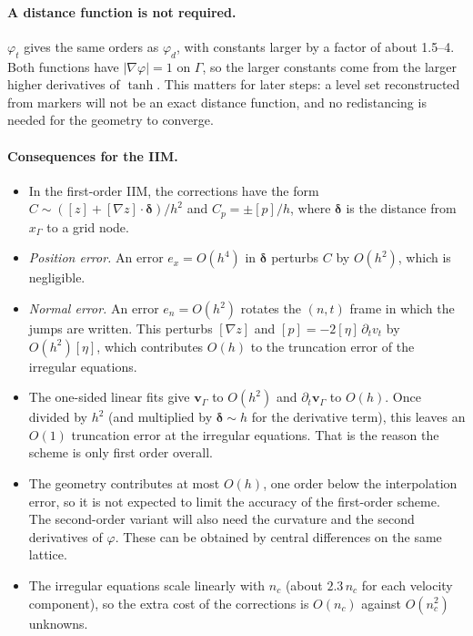 \documentclass[11pt,a4paper]{article}
\begin{document}
\paragraph{A distance function is not required.}
$\varphi_t$ gives the same orders as $\varphi_d$, with constants larger by a factor of about
1.5--4. Both functions have $|\nabla\varphi|=1$ on $\Gamma$, so the larger constants come from
the larger higher derivatives of $\tanh$. This matters for later steps: a level set reconstructed from
markers will not be an exact distance function, and no redistancing is needed for the geometry
to converge.

\paragraph{Consequences for the IIM.}
\begin{itemize}
  \item In the first-order IIM, the corrections have the form
    $C\sim([z]+[\nabla z]\cdot\boldsymbol\delta)/h^2$ and $C_p=\pm[p]/h$, where
    $\boldsymbol\delta$ is the distance from $x_\Gamma$ to a grid node.
  \item \emph{Position error.} An error $e_x=O(h^4)$ in $\boldsymbol\delta$ perturbs $C$ by
    $O(h^2)$, which is negligible.
  \item \emph{Normal error.} An error $e_n=O(h^2)$ rotates the $(n,t)$ frame in which the jumps
    are written. This perturbs $[\nabla z]$ and $[p]=-2[\eta]\,\partial_t v_t$ by
    $O(h^2)[\eta]$, which contributes $O(h)$ to the truncation error of the irregular
    equations.
  \item The one-sided linear fits give $\mathbf v_\Gamma$ to $O(h^2)$ and
    $\partial_t\mathbf v_\Gamma$ to $O(h)$. Once divided by $h^2$ (and multiplied by
    $\boldsymbol\delta\sim h$ for the derivative term), this leaves an $O(1)$ truncation error at
    the irregular equations. That is the reason the scheme is only first order overall.
  \item The geometry contributes at most $O(h)$, one order below the interpolation error, so it
    is not expected to limit the accuracy of the first-order scheme. The second-order variant
    will also need the curvature and the second derivatives of $\varphi$. These can be obtained
    by central differences on the same lattice.
  \item The irregular equations scale linearly with $n_c$ (about $2.3\,n_c$ for each
    velocity component), so the extra cost of the corrections is $O(n_c)$ against $O(n_c^2)$
    unknowns.
\end{itemize}
\end{document}
